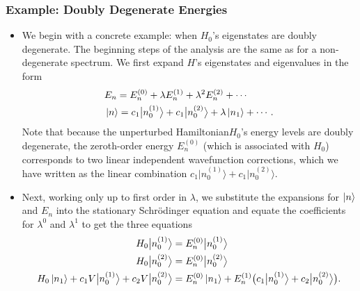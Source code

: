 \documentclass[11pt, a4paper]{article}
\newcommand{\Schro}{Schr\"{o}dinger\xspace}
\newcommand{\Ham}{Hamiltonian\xspace}
\newcommand{\bket}[1]{\big | {#1} \big \rangle }
\begin{document}
\subsubsection{Example: Doubly Degenerate Energies}
\begin{itemize}
    \item We begin with a concrete example: when $ H_{0} $'s eigenstates are doubly degenerate. The beginning steps of the analysis are the same as for a non-degenerate spectrum. We first expand $ H $'s eigenstates and eigenvalues in the form
    \begin{align*}
        &E_{n} = E_{n}^{(0)} + \lambda E_{n}^{(1)} + \lambda^{2} E_{n}^{(2)} + \cdots\\
        &\ket{n} = c_{1}\bket{n_{0}^{(1)}} + c_{1}\bket{n_{0}^{(2)}} + \lambda \ket{n_{1}} +  \cdots.
    \end{align*}
    Note that because the unperturbed \Ham $ H_{0} $'s energy levels are doubly degenerate, the zeroth-order energy $ E_{n}^{(0)} $ (which is associated with $ H_{0} $) corresponds to two linear independent wavefunction corrections, which we have written as the linear combination $ c_{1}\bket{n_{0}^{(1)}} + c_{1}\bket{n_{0}^{(2)}} $. 

    \item Next, working only up to first order in $ \lambda $, we substitute the expansions for $ \ket{n} $ and $ E_{n} $ into the stationary \Schro equation and equate the coefficients for $ \lambda^{0} $ and $ \lambda^{1} $ to get the three equations
    \begin{align*}
        H_{0} \bket{n_{0}^{(1)}} &= E_{n}^{(0)} \bket{n_{0}^{(1)}}\\
        H_{0} \bket{n_{0}^{(2)}} &= E_{n}^{(0)} \bket{n_{0}^{(2)}}\\
        H_{0}\ket{n_{1}} + c_{1}V \bket{n_{0}^{(1)}} + c_{2}V \bket{n_{0}^{(2)}} &= E_{n}^{(0)} \ket{n_{1}} + E_{n}^{(1)} \big( c_{1}\bket{n_{0}^{(1)}} + c_{2}\bket{n_{0}^{(2)}} \big).
    \end{align*}
    

\end{itemize}
\end{document}
